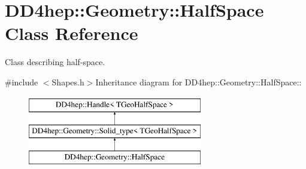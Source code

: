 \hypertarget{class_d_d4hep_1_1_geometry_1_1_half_space}{
\section{DD4hep::Geometry::HalfSpace Class Reference}
\label{class_d_d4hep_1_1_geometry_1_1_half_space}
}


Class describing half-\/space.  


{\ttfamily \#include $<$Shapes.h$>$}Inheritance diagram for DD4hep::Geometry::HalfSpace::\begin{figure}[H]
\begin{center}
\leavevmode
\includegraphics[height=3cm]{class_d_d4hep_1_1_geometry_1_1_half_space}
\end{center}
\end{figure}
